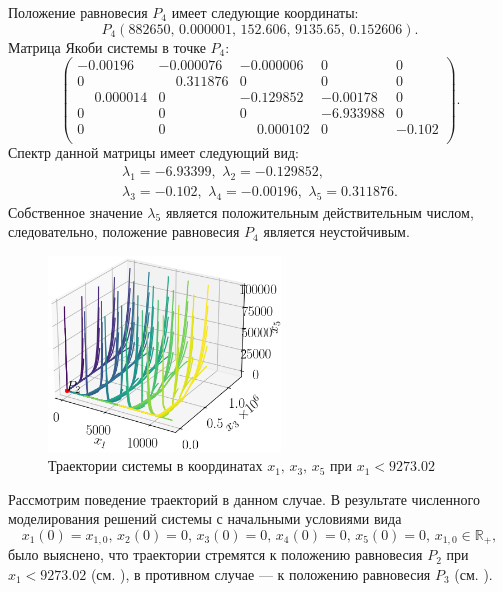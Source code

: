 \documentclass[14pt,a4paper]{extarticle}
\begin{document}
\begin{example}
		Положение равновесия $P_4$ имеет следующие координаты:
		\[P_4\left(882650,\,0.000001,\,152.606,\,9135.65,\,0.152606\right).\]
		Матрица Якоби системы в точке $P_4$: 
		\[\begin{pmatrix}
			-0.00196&  -0.000076 &-0.000006&  0    &    0\\
			 0     &   \phantom{-}0.311876&  0     &   0    &    0\\
			 \phantom{-}0.000014&  0     &  -0.129852& -0.00178 &  0\\
			 0   &     0     &   0    &   -6.933988 & 0\\
			 0    &    0   &     \phantom{-}0.000102 & 0    &   -0.102\\
		\end{pmatrix}.\]
		Спектр данной матрицы имеет следующий вид:
		\begin{multline*}
			\lambda_1=-6.93399,\,\, \lambda_2=-0.129852,\\
			\lambda_3=-0.102,\,\, \lambda_4=-0.00196,\,\, \lambda_5=0.311876.
		\end{multline*}
		Собственное значение $\lambda_5$ является положительным действительным числом, следовательно, положение равновесия $P_4$ является неустойчивым. 
		
		\begin{figure}[h]
			\centering
			\includegraphics[width=0.55\textwidth]{media/Figure_15.png}
			\caption{Траектории системы в координатах $x_1,\, x_3,\, x_5$ при $x_1 < 9273.02$}
			\label{fig:model_P2_zone}
		\end{figure}
		
		Рассмотрим поведение траекторий в данном случае. В результате численного моделирования решений системы с начальными условиями вида 
		\[x_1(0)=x_{1,0},\, x_2(0)=0,\, x_3(0)=0,\, x_4(0)=0,\, x_5(0)=0,\, x_{1,0}\in\mathbb{R}_{+},\]
		было выяснено, что траектории стремятся к положению равновесия $P_2$ при $x_1 < 9273.02$ (см. ), в противном случае --- к положению равновесия $P_3$ (см. ).
		

\end{example}
\end{document}
